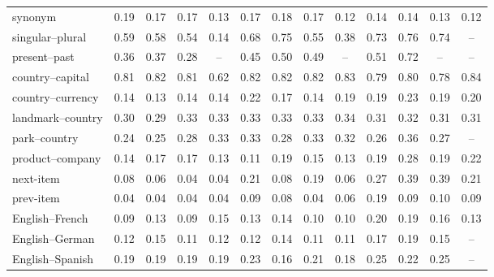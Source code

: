 \begin{tabular}{@{}lcccccccccccc@{}}
synonym & 0.19 & 0.17 & 0.17 & 0.13 & 0.17 & 0.18 & 0.17 & 0.12 & 0.14 & 0.14 & 0.13 & 0.12 \\
singular--plural & 0.59 & 0.58 & 0.54 & 0.14 & 0.68 & 0.75 & 0.55 & 0.38 & 0.73 & 0.76 & 0.74 & -- \\
present--past & 0.36 & 0.37 & 0.28 & -- & 0.45 & 0.50 & 0.49 & -- & 0.51 & 0.72 & -- & -- \\
country--capital & 0.81 & 0.82 & 0.81 & 0.62 & 0.82 & 0.82 & 0.82 & 0.83 & 0.79 & 0.80 & 0.78 & 0.84 \\
country--currency & 0.14 & 0.13 & 0.14 & 0.14 & 0.22 & 0.17 & 0.14 & 0.19 & 0.19 & 0.23 & 0.19 & 0.20 \\
landmark--country & 0.30 & 0.29 & 0.33 & 0.33 & 0.33 & 0.33 & 0.33 & 0.34 & 0.31 & 0.32 & 0.31 & 0.31 \\
park--country & 0.24 & 0.25 & 0.28 & 0.33 & 0.33 & 0.28 & 0.33 & 0.32 & 0.26 & 0.36 & 0.27 & -- \\
product--company & 0.14 & 0.17 & 0.17 & 0.13 & 0.11 & 0.19 & 0.15 & 0.13 & 0.19 & 0.28 & 0.19 & 0.22 \\
next-item & 0.08 & 0.06 & 0.04 & 0.04 & 0.21 & 0.08 & 0.19 & 0.06 & 0.27 & 0.39 & 0.39 & 0.21 \\
prev-item & 0.04 & 0.04 & 0.04 & 0.04 & 0.09 & 0.08 & 0.04 & 0.06 & 0.19 & 0.09 & 0.10 & 0.09 \\
English--French & 0.09 & 0.13 & 0.09 & 0.15 & 0.13 & 0.14 & 0.10 & 0.10 & 0.20 & 0.19 & 0.16 & 0.13 \\
English--German & 0.12 & 0.15 & 0.11 & 0.12 & 0.12 & 0.14 & 0.11 & 0.11 & 0.17 & 0.19 & 0.15 & -- \\
English--Spanish & 0.19 & 0.19 & 0.19 & 0.19 & 0.23 & 0.16 & 0.21 & 0.18 & 0.25 & 0.22 & 0.25 & -- \\
\bottomrule
\end{tabular}
